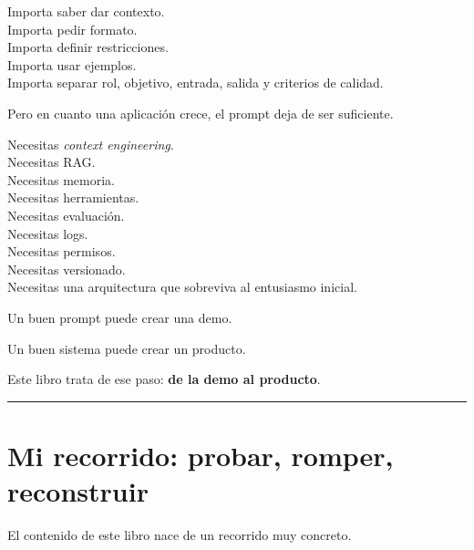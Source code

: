 Importa saber dar contexto.\\
Importa pedir formato.\\
Importa definir restricciones.\\
Importa usar ejemplos.\\
Importa separar rol, objetivo, entrada, salida y criterios de calidad.

Pero en cuanto una aplicación crece, el prompt deja de ser suficiente.

Necesitas \emph{context engineering}.\\
Necesitas RAG.\\
Necesitas memoria.\\
Necesitas herramientas.\\
Necesitas evaluación.\\
Necesitas logs.\\
Necesitas permisos.\\
Necesitas versionado.\\
Necesitas una arquitectura que sobreviva al entusiasmo inicial.

Un buen prompt puede crear una demo.

Un buen sistema puede crear un producto.

Este libro trata de ese paso: \textbf{de la demo al producto}.

\begin{center}\rule{0.5\linewidth}{0.5pt}\end{center}

\section{Mi recorrido: probar, romper,
reconstruir}\label{mi-recorrido-probar-romper-reconstruir}

El contenido de este libro nace de un recorrido muy concreto.

